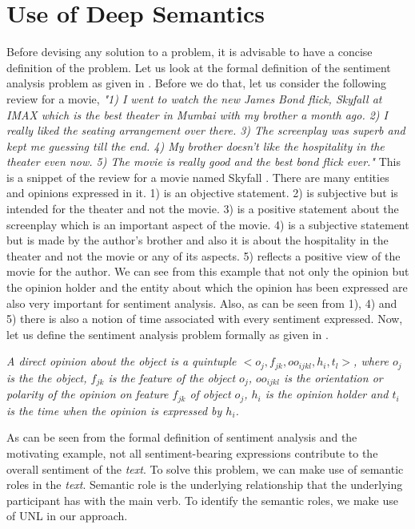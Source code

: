 \section{Use of Deep Semantics}\label{deep}
Before devising any solution to a problem, it is advisable to have a concise definition of the problem. Let us look at the formal definition of the sentiment analysis 
problem as given in \citep*{liu2010sentiment}. Before we do that, let us consider the following review for a movie, \textit{"1) I went to watch the new James Bond flick, 
Skyfall at IMAX which is the best theater in Mumbai with my brother a month ago. 2) I really liked the seating arrangement over there. 3) The screenplay was superb 
and kept me guessing till the end. 4) My brother doesn’t like the hospitality in the theater even now. 5) The movie is really good and the best bond flick ever."}
This is a snippet of the review for a movie named Skyfall . There are many entities and opinions expressed in it. 1) is an objective statement. 2) is subjective but 
is intended for the theater and not the movie. 3) is a positive statement about the screenplay which is an important aspect of the movie. 4) is a subjective
statement but is made by the author’s brother and also it is about the hospitality in the theater and not the movie or any of its aspects. 5) reflects a positive
view of the movie for the author. We can see from this example that not only the opinion but the opinion holder and the entity about which the opinion has been expressed 
are also very important for sentiment analysis. Also, as can be seen from 1), 4) and 5) there is also a notion of time associated with every sentiment expressed.
Now, let us define the sentiment analysis problem formally as given in \citep*{liu2010sentiment}.
  
\textit{A direct opinion about the object is a quintuple \(<o_j,f_{jk},oo_{ijkl},h_i,t_l>\), where \(o_j\) is the the object, \(f_{jk}\) is the feature of the object
\(o_j\), \(oo_{ijkl}\) is the orientation or polarity of the opinion on feature \(f_{jk}\) of object \(o_j\), \(h_i\) is the opinion holder and \(t_i\) is the time 
when the opinion is expressed by \(h_i\).}
  
As can be seen from the formal definition of sentiment analysis and the motivating example, not all sentiment-bearing expressions contribute to the overall sentiment
of the \textit{text}. To solve this problem, we can make use of semantic roles in the \textit{text}. Semantic role is the underlying relationship that the underlying
participant has with the main verb. To identify the semantic roles, we make use of UNL in our approach.
  
